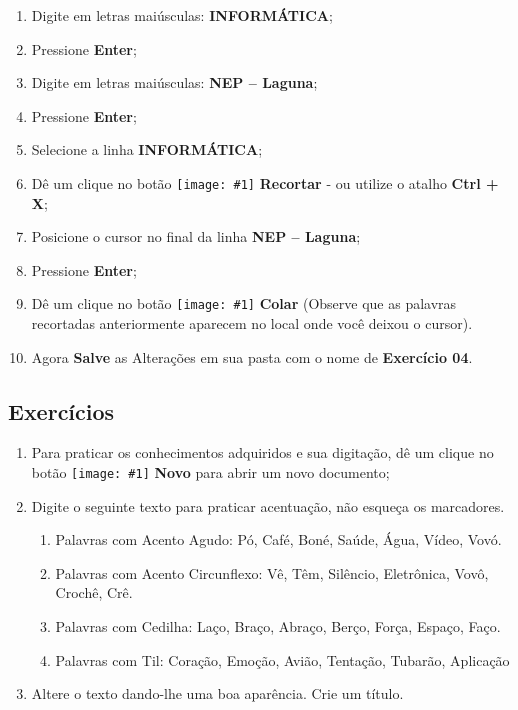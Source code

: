 \documentclass[hidelinks,12pt]{article}
\newcommand{\icon}[1]{\texttt{[image: \#1]}}
\begin{document}
\begin{enumerate}
	\item Digite em letras maiúsculas: \textbf{INFORMÁTICA};

	\item Pressione \textbf{Enter};

	\item Digite em letras maiúsculas: \textbf{NEP – Laguna};

	\item Pressione \textbf{Enter};

	\item Selecione a linha \textbf{INFORMÁTICA};

	\item Dê um clique no botão  \icon{Figures/recortar} \textbf{Recortar} - ou utilize o atalho \textbf{Ctrl + X};

	\item Posicione o cursor no final da linha \textbf{NEP – Laguna};

	\item Pressione \textbf{Enter};

	\item Dê um clique no botão \icon{Figures/colar} \textbf{Colar} (Observe que as palavras recortadas anteriormente aparecem no local onde você deixou o cursor).

	\item Agora \textbf{Salve} as Alterações em sua pasta com o nome de \textbf{Exercício 04}.
\end{enumerate}

\subsection{Exercícios}

\begin{enumerate}
	\item Para praticar os conhecimentos adquiridos e sua digitação, dê um clique no botão \icon{Figures/novo}
	 \textbf{Novo} para abrir um novo documento;

	\item Digite o seguinte texto para praticar acentuação, não esqueça os marcadores.

	\begin{enumerate}
		\item Palavras com Acento Agudo:
		Pó, Café, Boné, Saúde, Água, Vídeo, Vovó.

		\item Palavras com Acento Circunflexo: Vê, Têm, Silêncio, Eletrônica, Vovô, Crochê, Crê.

		\item Palavras com Cedilha: Laço, Braço, Abraço, Berço, Força, Espaço, Faço.

		\item Palavras com Til: Coração, Emoção, Avião, Tentação, Tubarão, Aplicação
    \end{enumerate}


	\item Altere o texto dando-lhe uma boa aparência. Crie um título.
\end{enumerate}
\end{document}
